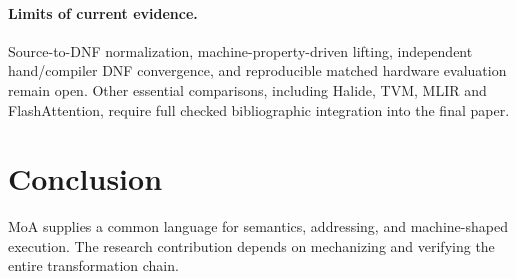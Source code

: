 \documentclass[sigplan,10pt,review,anonymous]{acmart}
\begin{document}
\paragraph{Limits of current evidence.}
Source-to-DNF normalization, machine-property-driven lifting, independent hand/compiler DNF convergence, and reproducible matched hardware evaluation remain open. Other essential comparisons, including Halide, TVM, MLIR and FlashAttention, require full checked bibliographic integration into the final paper.
\section{Conclusion}
MoA supplies a common language for semantics, addressing, and machine-shaped execution. The research contribution depends on mechanizing and verifying the entire transformation chain.


\end{document}

